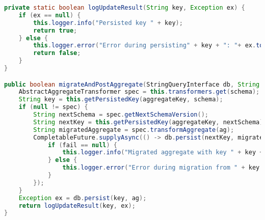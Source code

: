 \begin{lstlisting}[language=Java, caption={Metode for håndtering av POST-spørring i Migrator.}]
private static boolean logUpdateResult(String key, Exception ex) {
    if (ex == null) {
        this.logger.info("Persisted key " + key);
        return true;
    } else {
        this.logger.error("Error during persisting" + key + ": "+ ex.toString());
        return false;
    }
}

public boolean migrateAndPostAggregate(StringQueryInterface db, String aggregateKey, String schema, String ag) {
    AbstractAggregateTransformer spec = this.transformers.get(schema);
    String key = this.getPersistedKey(aggregateKey, schema);
    if (null != spec) {
        String nextSchema = spec.getNextSchemaVersion();
        String nextKey = this.getPersistedKey(aggregateKey, nextSchema);
        String migratedAggregate = spec.transformAggregate(ag);
        CompletableFuture.supplyAsync(() -> db.persist(nextKey, migratedAggregate)).thenAcceptAsync((fail) -> {
            if (fail == null) {
                this.logger.info("Migrated aggregate with key " + key + " to " + nextKey);
            } else {
                this.logger.error("Error during migration from " + key + " to " + nextKey + ":\n"+ fail.toString());
            }
        });
    }
    Exception ex = db.persist(key, ag);
    return logUpdateResult(key, ex);
}
\end{lstlisting}
